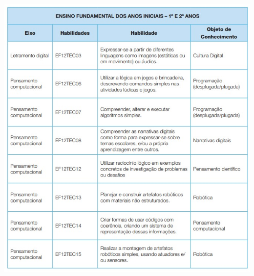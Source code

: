


\pagebreak

\begin{center}
	\includegraphics[height=\textheight]{./IMG-GIT/ano-1-e-2.jpeg}
\end{center}

\pagebreak

%
\normalsize


